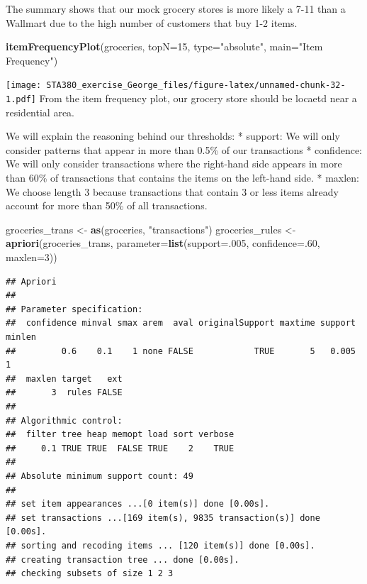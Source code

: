 \documentclass[]{article}
\newenvironment{Shaded}{\begin{snugshade}}{\end{snugshade}}
\newcommand{\DataTypeTok}[1]{\textcolor[rgb]{0.13,0.29,0.53}{#1}}
\newcommand{\DecValTok}[1]{\textcolor[rgb]{0.00,0.00,0.81}{#1}}
\newcommand{\KeywordTok}[1]{\textcolor[rgb]{0.13,0.29,0.53}{\textbf{#1}}}
\newcommand{\NormalTok}[1]{#1}
\newcommand{\StringTok}[1]{\textcolor[rgb]{0.31,0.60,0.02}{#1}}
\begin{document}
The summary shows that our mock grocery stores is more likely a 7-11
than a Wallmart due to the high number of customers that buy 1-2 items.

\begin{Shaded}
\begin{Highlighting}[]
\KeywordTok{itemFrequencyPlot}\NormalTok{(groceries, }\DataTypeTok{topN=}\DecValTok{15}\NormalTok{, }\DataTypeTok{type=}\StringTok{"absolute"}\NormalTok{, }\DataTypeTok{main=}\StringTok{"Item Frequency"}\NormalTok{)}
\end{Highlighting}
\end{Shaded}

\texttt{[image: STA380\_exercise\_George\_files/figure-latex/unnamed-chunk-32-1.pdf]}
From the item frequency plot, our grocery store should be locaetd near a
residential area.

We will explain the reasoning behind our thresholds: * support: We will
only consider patterns that appear in more than 0.5\% of our
transactions * confidence: We will only consider transactions where the
right-hand side appears in more than 60\% of transactions that contains
the items on the left-hand side. * maxlen: We choose length 3 because
transactions that contain 3 or less items already account for more than
50\% of all transactions.

\begin{Shaded}
\begin{Highlighting}[]
\NormalTok{groceries_trans <-}\StringTok{ }\KeywordTok{as}\NormalTok{(groceries, }\StringTok{"transactions"}\NormalTok{)}
\NormalTok{groceries_rules <-}\StringTok{ }\KeywordTok{apriori}\NormalTok{(groceries_trans, }\DataTypeTok{parameter=}\KeywordTok{list}\NormalTok{(}\DataTypeTok{support=}\NormalTok{.}\DecValTok{005}\NormalTok{, }\DataTypeTok{confidence=}\NormalTok{.}\DecValTok{60}\NormalTok{, }\DataTypeTok{maxlen=}\DecValTok{3}\NormalTok{))}
\end{Highlighting}
\end{Shaded}

\begin{verbatim}
## Apriori
## 
## Parameter specification:
##  confidence minval smax arem  aval originalSupport maxtime support minlen
##         0.6    0.1    1 none FALSE            TRUE       5   0.005      1
##  maxlen target   ext
##       3  rules FALSE
## 
## Algorithmic control:
##  filter tree heap memopt load sort verbose
##     0.1 TRUE TRUE  FALSE TRUE    2    TRUE
## 
## Absolute minimum support count: 49 
## 
## set item appearances ...[0 item(s)] done [0.00s].
## set transactions ...[169 item(s), 9835 transaction(s)] done [0.00s].
## sorting and recoding items ... [120 item(s)] done [0.00s].
## creating transaction tree ... done [0.00s].
## checking subsets of size 1 2 3
\end{verbatim}
\end{document}
